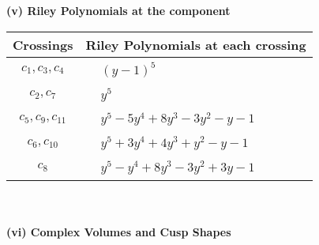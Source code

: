 \documentclass[1p]{elsarticle_modified}
\theoremstyle{definition}
\begin{document}
\newpage\renewcommand{\arraystretch}{1}
\flushleft \textbf{(v) Riley Polynomials at the component}\newline \\
\begin{tabular}{m{50pt}|m{274pt}}
Crossings & \hspace{64pt}Riley Polynomials at each crossing \\
\hline $$\begin{aligned}c_{1},c_{3},c_{4}\end{aligned}$$&$\begin{aligned}
&(y-1)^5
\end{aligned}$\\
\hline $$\begin{aligned}c_{2},c_{7}\end{aligned}$$&$\begin{aligned}
&y^5
\end{aligned}$\\
\hline $$\begin{aligned}c_{5},c_{9},c_{11}\end{aligned}$$&$\begin{aligned}
&y^5-5 y^4+8 y^3-3 y^2- y-1
\end{aligned}$\\
\hline $$\begin{aligned}c_{6},c_{10}\end{aligned}$$&$\begin{aligned}
&y^5+3 y^4+4 y^3+y^2- y-1
\end{aligned}$\\
\hline $$\begin{aligned}c_{8}\end{aligned}$$&$\begin{aligned}
&y^5- y^4+8 y^3-3 y^2+3 y-1
\end{aligned}$\\
\hline
\end{tabular}\\~\\
\newpage\flushleft \textbf{(vi) Complex Volumes and Cusp Shapes}
\end{document}
